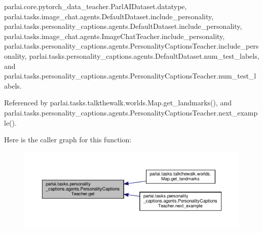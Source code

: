 parlai.\+core.\+pytorch\+\_\+data\+\_\+teacher.\+Parl\+A\+I\+Dataset.\+datatype, parlai.\+tasks.\+image\+\_\+chat.\+agents.\+Default\+Dataset.\+include\+\_\+personality, parlai.\+tasks.\+personality\+\_\+captions.\+agents.\+Default\+Dataset.\+include\+\_\+personality, parlai.\+tasks.\+image\+\_\+chat.\+agents.\+Image\+Chat\+Teacher.\+include\+\_\+personality, parlai.\+tasks.\+personality\+\_\+captions.\+agents.\+Personality\+Captions\+Teacher.\+include\+\_\+personality, parlai.\+tasks.\+personality\+\_\+captions.\+agents.\+Default\+Dataset.\+num\+\_\+test\+\_\+labels, and parlai.\+tasks.\+personality\+\_\+captions.\+agents.\+Personality\+Captions\+Teacher.\+num\+\_\+test\+\_\+labels.



Referenced by parlai.\+tasks.\+talkthewalk.\+worlds.\+Map.\+get\+\_\+landmarks(), and parlai.\+tasks.\+personality\+\_\+captions.\+agents.\+Personality\+Captions\+Teacher.\+next\+\_\+example().

Here is the caller graph for this function\+:
\nopagebreak
\begin{figure}[H]
\begin{center}
\leavevmode
\includegraphics[width=350pt]{classparlai_1_1tasks_1_1personality__captions_1_1agents_1_1PersonalityCaptionsTeacher_a2f146ae93a6b1f19e570ef7aa8950c1b_icgraph}
\end{center}
\end{figure}
\mbox{\label{classparlai_1_1tasks_1_1personality__captions_1_1agents_1_1PersonalityCaptionsTeacher_ace67289d386996e9dab37cc9fcca55b4}} 
